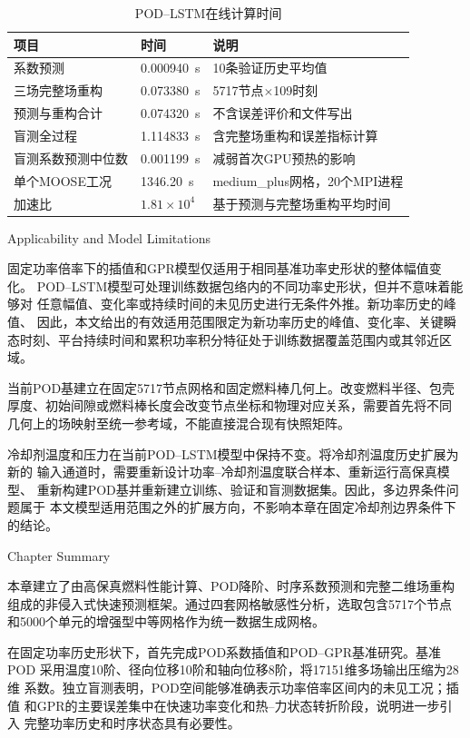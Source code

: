 \begin{table}[htbp]
	\centering
	\caption{POD--LSTM在线计算时间}
	\label{tab:formal_timing_results}
	\begin{tabularx}{\textwidth}
		{XXX}
		\toprule
		项目 & 时间 & 说明 \\
		\midrule
		系数预测 & 0.000940~s & 10条验证历史平均值 \\
		三场完整场重构 & 0.073380~s & 5717节点$\times$109时刻 \\
		预测与重构合计 & 0.074320~s & 不含误差评价和文件写出 \\
		盲测全过程 & 1.114833~s & 含完整场重构和误差指标计算 \\
		盲测系数预测中位数 & 0.001199~s & 减弱首次GPU预热的影响 \\
		单个MOOSE工况 & 1346.20~s & medium\_plus网格，20个MPI进程 \\
		加速比 & $1.81\times10^4$ & 基于预测与完整场重构平均时间 \\
		\bottomrule
	\end{tabularx}
\end{table}

{Applicability and Model Limitations}

固定功率倍率下的插值和GPR模型仅适用于相同基准功率史形状的整体幅值变化。
POD--LSTM模型可处理训练数据包络内的不同功率史形状，但并不意味着能够对
任意幅值、变化率或持续时间的未见历史进行无条件外推。新功率历史的峰值、
因此，本文给出的有效适用范围限定为新功率历史的峰值、变化率、关键瞬态时刻、平台持续时间和累积功率积分特征处于训练数据覆盖范围内或其邻近区域。

当前POD基建立在固定5717节点网格和固定燃料棒几何上。改变燃料半径、包壳
厚度、初始间隙或燃料棒长度会改变节点坐标和物理对应关系，需要首先将不同
几何上的场映射至统一参考域，不能直接混合现有快照矩阵。

冷却剂温度和压力在当前POD--LSTM模型中保持不变。将冷却剂温度历史扩展为新的
输入通道时，需要重新设计功率--冷却剂温度联合样本、重新运行高保真模型、
重新构建POD基并重新建立训练、验证和盲测数据集。因此，多边界条件问题属于
本文模型适用范围之外的扩展方向，不影响本章在固定冷却剂边界条件下的结论。

{Chapter Summary}

本章建立了由高保真燃料性能计算、POD降阶、时序系数预测和完整二维场重构
组成的非侵入式快速预测框架。通过四套网格敏感性分析，选取包含5717个节点
和5000个单元的增强型中等网格作为统一数据生成网格。

在固定功率历史形状下，首先完成POD系数插值和POD--GPR基准研究。基准POD
采用温度10阶、径向位移10阶和轴向位移8阶，将17151维多场输出压缩为28维
系数。独立盲测表明，POD空间能够准确表示功率倍率区间内的未见工况；插值
和GPR的主要误差集中在快速功率变化和热--力状态转折阶段，说明进一步引入
完整功率历史和时序状态具有必要性。

